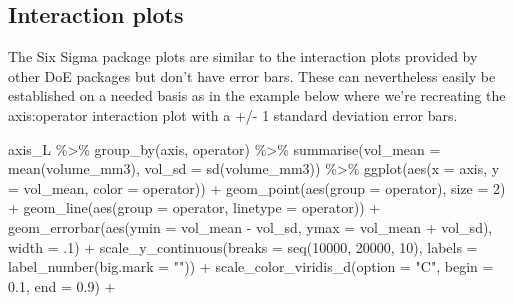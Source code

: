 \documentclass[
]{book}
\newenvironment{Shaded}{\begin{snugshade}}{\end{snugshade}}
\newcommand{\AttributeTok}[1]{\textcolor[rgb]{0.77,0.63,0.00}{#1}}
\newcommand{\DecValTok}[1]{\textcolor[rgb]{0.00,0.00,0.81}{#1}}
\newcommand{\FloatTok}[1]{\textcolor[rgb]{0.00,0.00,0.81}{#1}}
\newcommand{\FunctionTok}[1]{\textcolor[rgb]{0.00,0.00,0.00}{#1}}
\newcommand{\NormalTok}[1]{#1}
\newcommand{\SpecialCharTok}[1]{\textcolor[rgb]{0.00,0.00,0.00}{#1}}
\newcommand{\StringTok}[1]{\textcolor[rgb]{0.31,0.60,0.02}{#1}}
\begin{document}
\hypertarget{interaction-plots}{%
\subsection{Interaction plots}\label{interaction-plots}}

The Six Sigma package plots are similar to the interaction plots provided by other DoE packages but don't have error bars. These can nevertheless easily be established on a needed basis as in the example below where we're recreating the axis:operator interaction plot with a +/- 1 standard deviation error bars.

\begin{Shaded}
\begin{Highlighting}[]
\NormalTok{axis\_L }\SpecialCharTok{\%\textgreater{}\%}
  \FunctionTok{group\_by}\NormalTok{(axis, operator) }\SpecialCharTok{\%\textgreater{}\%}
  \FunctionTok{summarise}\NormalTok{(}\AttributeTok{vol\_mean =} \FunctionTok{mean}\NormalTok{(volume\_mm3), }\AttributeTok{vol\_sd =} \FunctionTok{sd}\NormalTok{(volume\_mm3)) }\SpecialCharTok{\%\textgreater{}\%}
  \FunctionTok{ggplot}\NormalTok{(}\FunctionTok{aes}\NormalTok{(}\AttributeTok{x =}\NormalTok{ axis, }\AttributeTok{y =}\NormalTok{ vol\_mean, }\AttributeTok{color =}\NormalTok{ operator)) }\SpecialCharTok{+}
  \FunctionTok{geom\_point}\NormalTok{(}\FunctionTok{aes}\NormalTok{(}\AttributeTok{group =}\NormalTok{ operator), }\AttributeTok{size =} \DecValTok{2}\NormalTok{) }\SpecialCharTok{+}
  \FunctionTok{geom\_line}\NormalTok{(}\FunctionTok{aes}\NormalTok{(}\AttributeTok{group =}\NormalTok{ operator, }\AttributeTok{linetype =}\NormalTok{ operator)) }\SpecialCharTok{+}
  \FunctionTok{geom\_errorbar}\NormalTok{(}\FunctionTok{aes}\NormalTok{(}\AttributeTok{ymin =}\NormalTok{ vol\_mean }\SpecialCharTok{{-}}\NormalTok{ vol\_sd, }
                    \AttributeTok{ymax =}\NormalTok{ vol\_mean }\SpecialCharTok{+}\NormalTok{ vol\_sd),}
                \AttributeTok{width =}\NormalTok{ .}\DecValTok{1}\NormalTok{) }\SpecialCharTok{+}
  \FunctionTok{scale\_y\_continuous}\NormalTok{(}\AttributeTok{breaks =} \FunctionTok{seq}\NormalTok{(}\DecValTok{10000}\NormalTok{, }\DecValTok{20000}\NormalTok{, }\DecValTok{10}\NormalTok{),}
                     \AttributeTok{labels =} \FunctionTok{label\_number}\NormalTok{(}\AttributeTok{big.mark =} \StringTok{"\textquotesingle{}"}\NormalTok{)) }\SpecialCharTok{+}
  \FunctionTok{scale\_color\_viridis\_d}\NormalTok{(}\AttributeTok{option =} \StringTok{"C"}\NormalTok{, }\AttributeTok{begin =} \FloatTok{0.1}\NormalTok{, }\AttributeTok{end =} \FloatTok{0.9}\NormalTok{) }\SpecialCharTok{+}

\end{Highlighting}
\end{Shaded}
\end{document}
